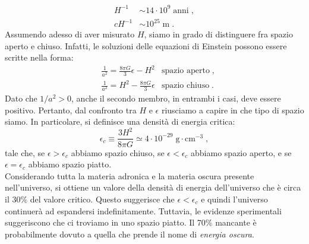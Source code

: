 \documentclass[12pt,a4paper]{report}
\theoremstyle{definition}
\begin{document}
\begin{align*}
H^{-1}&\sim 14\cdot 10^9\;\mathrm{anni}\;, \\
cH^{-1} &\sim 10^{25}\;\mathrm{m}\;.
\end{align*}
Assumendo adesso di aver misurato $H$, siamo in grado di distinguere fra spazio aperto e chiuso. Infatti, le soluzioni delle equazioni di Einstein possono essere scritte nella forma:
\begin{align}
&\frac{1}{a^2}=\frac{8\pi G}{3}\epsilon -H^2 &\mbox{spazio aperto}\;, \\
&\frac{1}{a^2}=H^2-\frac{8\pi G}{3}\epsilon &\mbox{spazio chiuso}\;.
\end{align}
Dato che $1/a^2>0$, anche il secondo membro, in entrambi i casi, deve essere positivo. Pertanto, dal confronto tra $H$ e $\epsilon$ riusciamo a capire in che tipo di spazio siamo. In particolare, si definisce una densità di energia critica:
\begin{equation}
\epsilon_c\equiv \frac{3H^2}{8\pi G}\simeq 4\cdot 10^{-29}\;\mathrm{g}\cdot\mathrm{cm}^{-3}\;,
\end{equation}
tale che, se $\epsilon>\epsilon_c$ abbiamo spazio chiuso, se $\epsilon<\epsilon_c$ abbiamo spazio aperto, e se $\epsilon=\epsilon_c$ abbiamo spazio piatto. \\
Considerando tutta la materia adronica e la materia oscura presente nell'universo, si ottiene un valore della densità di energia dell'universo che è circa il 30\% del valore critico. Questo suggerisce che $\epsilon<\epsilon_c$ e quindi l'universo continuerà ad espandersi indefinitamente. Tuttavia, le evidenze sperimentali suggeriscono che ci troviamo in uno spazio piatto. Il 70\% mancante è probabilmente dovuto a quella che prende il nome di \emph{energia oscura}.
\end{document}
